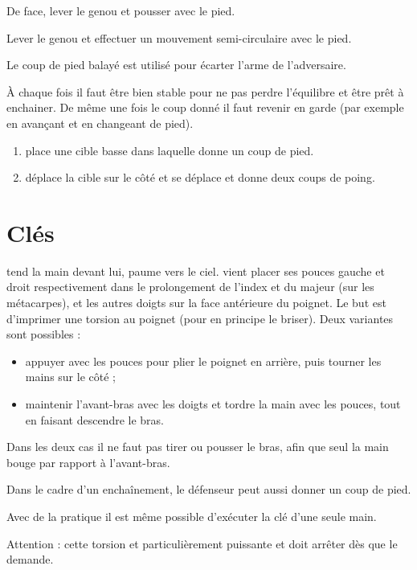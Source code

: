 \begin{coup}
	De face, lever le genou et pousser avec le pied.
\end{coup}


\begin{coup}
	Lever le genou et effectuer un mouvement semi-circulaire avec le pied.
\end{coup}


Le coup de pied balayé est utilisé pour écarter l'arme de l'adversaire.

À chaque fois il faut être bien stable pour ne pas perdre l'équilibre et être prêt à enchainer. De même une fois le coup donné il faut revenir en garde (par exemple en avançant et en changeant de pied).


\begin{exercice}

	
	\begin{enumerate}
		\item \D place une cible basse dans laquelle \A donne un coup de pied.
		
		\item \D déplace la cible sur le côté et \A se déplace et donne deux coups de poing.
	\end{enumerate}
\end{exercice}


\section{Clés}


\begin{technique}
	\label{mains:tech:torsion-poignet}

	\A tend la main devant lui, paume vers le ciel.
	\D vient placer ses pouces gauche et droit respectivement dans le prolongement de l'index et du majeur (sur les métacarpes), et les autres doigts sur la face antérieure du poignet.
	Le but est d'imprimer une torsion au poignet (pour en principe le briser).
	Deux variantes sont possibles :
	\begin{itemize}
		\item appuyer avec les pouces pour plier le poignet en arrière, puis tourner les mains sur le côté ;
		\item maintenir l'avant-bras avec les doigts et tordre la main avec les pouces, tout en faisant descendre le bras.
	\end{itemize}
	Dans les deux cas il ne faut pas tirer ou pousser le bras, afin que seul la main bouge par rapport à l'avant-bras.

	Dans le cadre d'un enchaînement, le défenseur peut aussi donner un coup de pied.

	Avec de la pratique il est même possible d'exécuter la clé d'une seule main.

	Attention : cette torsion et particulièrement puissante et \D doit arrêter dès que \A le demande.
\end{technique}


